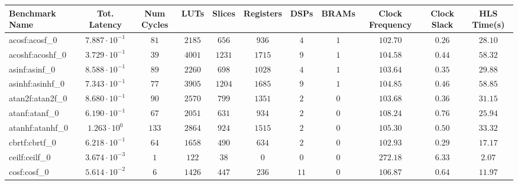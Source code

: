 \begin{tabular}{|l|c|c|c|c|c|c|c|c|c|c|}
\hline
Benchmark Name               & Tot. Latency            & Num Cycles & LUTs      & Slices    & Registers & DSPs    & BRAMs & Clock Frequency & Clock Slack & HLS Time(s) \\
\hline
acosf:acosf\_0               & $ 7.887 \cdot 10^{-1} $ & $ 81     $ & $ 2185  $ & $ 656   $ & $ 936   $ & $ 4   $ & $ 1 $ & $ 102.70      $ & $ 0.26    $ & $ 28.10   $ \\
acoshf:acoshf\_0             & $ 3.729 \cdot 10^{-1} $ & $ 39     $ & $ 4001  $ & $ 1231  $ & $ 1715  $ & $ 9   $ & $ 1 $ & $ 104.58      $ & $ 0.44    $ & $ 58.32   $ \\
asinf:asinf\_0               & $ 8.588 \cdot 10^{-1} $ & $ 89     $ & $ 2260  $ & $ 698   $ & $ 1028  $ & $ 4   $ & $ 1 $ & $ 103.64      $ & $ 0.35    $ & $ 29.88   $ \\
asinhf:asinhf\_0             & $ 7.343 \cdot 10^{-1} $ & $ 77     $ & $ 3905  $ & $ 1204  $ & $ 1685  $ & $ 9   $ & $ 1 $ & $ 104.85      $ & $ 0.46    $ & $ 58.85   $ \\
atan2f:atan2f\_0             & $ 8.680 \cdot 10^{-1} $ & $ 90     $ & $ 2570  $ & $ 799   $ & $ 1351  $ & $ 2   $ & $ 0 $ & $ 103.68      $ & $ 0.36    $ & $ 31.15   $ \\
atanf:atanf\_0               & $ 6.190 \cdot 10^{-1} $ & $ 67     $ & $ 2051  $ & $ 631   $ & $ 934   $ & $ 2   $ & $ 0 $ & $ 108.24      $ & $ 0.76    $ & $ 25.94   $ \\
atanhf:atanhf\_0             & $ 1.263 \cdot 10^{0}  $ & $ 133    $ & $ 2864  $ & $ 924   $ & $ 1515  $ & $ 2   $ & $ 0 $ & $ 105.30      $ & $ 0.50    $ & $ 33.32   $ \\
cbrtf:cbrtf\_0               & $ 6.218 \cdot 10^{-1} $ & $ 64     $ & $ 1658  $ & $ 490   $ & $ 634   $ & $ 2   $ & $ 0 $ & $ 102.93      $ & $ 0.29    $ & $ 17.17   $ \\
ceilf:ceilf\_0               & $ 3.674 \cdot 10^{-3} $ & $ 1      $ & $ 122   $ & $ 38    $ & $ 0     $ & $ 0   $ & $ 0 $ & $ 272.18      $ & $ 6.33    $ & $ 2.07    $ \\
cosf:cosf\_0                 & $ 5.614 \cdot 10^{-2} $ & $ 6      $ & $ 1426  $ & $ 447   $ & $ 236   $ & $ 11  $ & $ 0 $ & $ 106.87      $ & $ 0.64    $ & $ 11.97   $ \\

\end{tabular}
